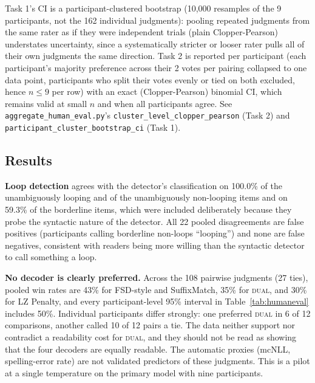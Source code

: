 \begin{table}[ht]
\vspace{4pt}
{\footnotesize Task 1's CI is a participant-clustered bootstrap (10,000 resamples of the 9 participants, not the 162 individual judgments): pooling repeated judgments from the same rater as if they were independent trials (plain Clopper-Pearson) understates uncertainty, since a systematically stricter or looser rater pulls all of their own judgments the same direction. Task 2 is reported per participant (each participant's majority preference across their 2 votes per pairing collapsed to one data point, participants who split their votes evenly or tied on both excluded, hence $n\le9$ per row) with an exact (Clopper-Pearson) binomial CI, which remains valid at small $n$ and when all participants agree. See \texttt{aggregate\_\allowbreak{}human\_\allowbreak{}eval.py}'s \texttt{cluster\_\allowbreak{}level\_\allowbreak{}clopper\_\allowbreak{}pearson} (Task 2) and \texttt{participant\_\allowbreak{}cluster\_\allowbreak{}bootstrap\_\allowbreak{}ci} (Task 1).}
\end{table}

\subsection{Results}
\textbf{Loop detection} agrees with the detector's classification on 100.0\% of the unambiguously looping and of the unambiguously non-looping items and on 59.3\% of the borderline items, which were included deliberately because they probe the syntactic nature of the detector. All 22 pooled disagreements are false positives (participants calling borderline non-loops ``looping'') and none are false negatives, consistent with readers being more willing than the syntactic detector to call something a loop.

\textbf{No decoder is clearly preferred.} Across the 108 pairwise judgments (27 ties), pooled win rates are 43\% for FSD-style and SuffixMatch, 35\% for \textsc{dual}, and 30\% for LZ Penalty, and every participant-level 95\% interval in Table~\ref{tab:humaneval} includes 50\%. Individual participants differ strongly: one preferred \textsc{dual} in 6 of 12 comparisons, another called 10 of 12 pairs a tie. The data neither support nor contradict a readability cost for \textsc{dual}, and they should not be read as showing that the four decoders are equally readable. The automatic proxies (mcNLL, spelling-error rate) are not validated predictors of these judgments. This is a pilot at a single temperature on the primary model with nine participants.

